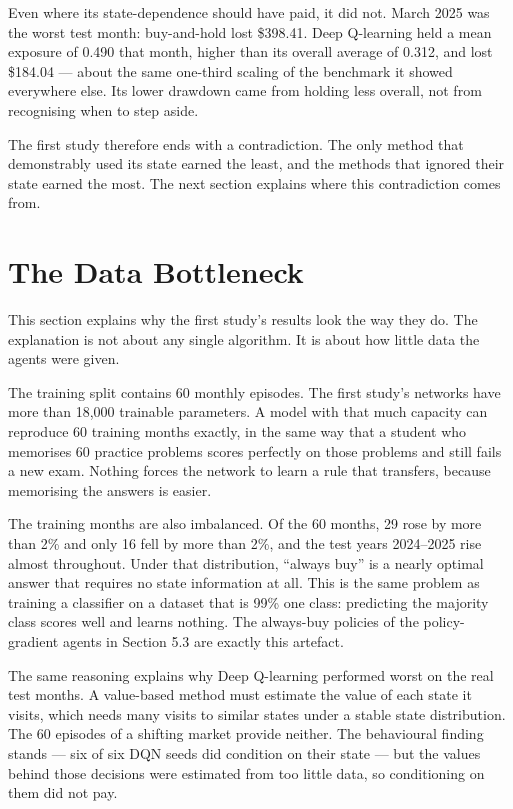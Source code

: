 Even where its state-dependence should have paid, it did not. March 2025
was the worst test month: buy-and-hold lost \$398.41. Deep Q-learning
held a mean exposure of 0.490 that month, higher than its overall
average of 0.312, and lost \$184.04 --- about the same one-third scaling
of the benchmark it showed everywhere else. Its lower drawdown came from
holding less overall, not from recognising when to step aside.

The first study therefore ends with a contradiction. The only method
that demonstrably used its state earned the least, and the methods that
ignored their state earned the most. The next section explains where
this contradiction comes from.

\section{The Data Bottleneck}

This section explains why the first study's results look the way they do. The
explanation is not about any single algorithm. It is about how little
data the agents were given.

The training split contains 60 monthly episodes. The first study's networks
have more than 18,000 trainable parameters. A model with that much
capacity can reproduce 60 training months exactly, in the same way that
a student who memorises 60 practice problems scores perfectly on those
problems and still fails a new exam. Nothing forces the network to learn
a rule that transfers, because memorising the answers is easier.

The training months are also imbalanced. Of the 60 months, 29 rose by
more than 2\% and only 16 fell by more than 2\%, and the test
years 2024--2025 rise almost throughout. Under that distribution,
``always buy'' is a nearly optimal answer that requires no state
information at all. This is the same problem as training a classifier on a
dataset that is 99\% one class: predicting the majority class scores
well and learns nothing. The always-buy policies of the policy-gradient
agents in Section 5.3 are exactly this artefact.

The same reasoning explains why Deep Q-learning performed worst on the
real test months. A value-based method must estimate the value of each
state it visits, which needs many visits to similar states under a
stable state distribution. The 60 episodes of a shifting market provide
neither. The behavioural finding stands --- six of six DQN seeds did
condition on their state --- but the values behind those decisions were
estimated from too little data, so conditioning on them did not pay.

